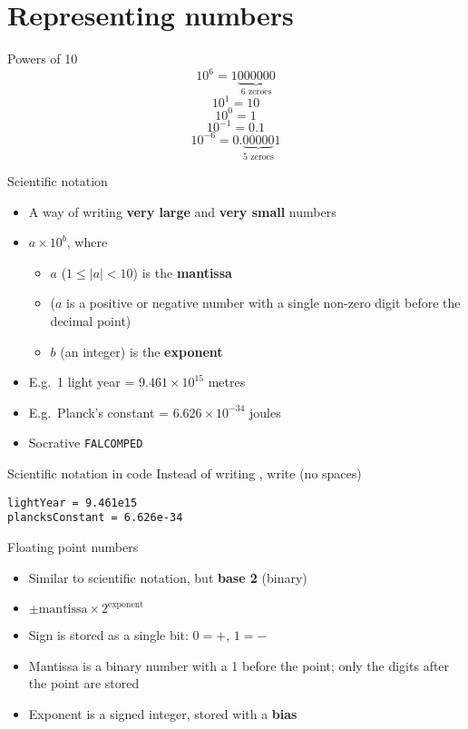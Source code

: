 \part{Representing numbers}
\frame{\partpage}

\lstset{language=Python}

\begin{frame}{Powers of 10}
	\pause
	$$ 10^6 = 1\underbrace{000000}_{\text{6 zeroes}} $$
	\pause
	$$ 10^1 = 10 $$
	\pause
	$$ 10^0 = 1 $$
	\pause
	$$ 10^{-1} = 0.1 $$
	\pause
	$$ 10^{-6} = 0.\underbrace{00000}_{\text{5 zeroes}}1 $$
\end{frame}

\begin{frame}{Scientific notation}
	\begin{itemize}
		\pause\item A way of writing \textbf{very large} and \textbf{very small} numbers
		\pause\item $a \times 10^b$, where
			\begin{itemize}
				\pause\item $a$ ($1 \leq |a| < 10$) is the \textbf{mantissa}
				\pause\item ($a$ is a positive or negative number
					with a single non-zero digit before the decimal point)
				\pause\item $b$ (an integer) is the \textbf{exponent}
			\end{itemize}
		\pause\item E.g.\ 1 light year = $9.461 \times 10^{15}$ metres
		\pause\item E.g.\ Planck's constant = $6.626 \times 10^{-34}$ joules
		\pause\item Socrative \texttt{FALCOMPED}
	\end{itemize}
\end{frame}

\begin{frame}[fragile]{Scientific notation in code}
	\pause Instead of writing , write  (no spaces)
	\pause
	\begin{lstlisting}
lightYear = 9.461e15
plancksConstant = 6.626e-34
	\end{lstlisting}
\end{frame}

\begin{frame}{Floating point numbers}
	\begin{itemize}
		\pause\item Similar to scientific notation, but \textbf{base 2} (binary)
		\pause\item $\pm \text{mantissa} \times 2^{\text{exponent}}$
		\pause\item Sign is stored as a single bit: $0=+$, $1=-$
		\pause\item Mantissa is a binary number with a 1 before the point;
			only the digits after the point are stored
		\pause\item Exponent is a signed integer, stored with a \textbf{bias}
	\end{itemize}
\end{frame}


